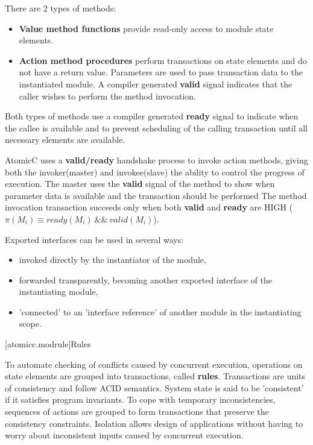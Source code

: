 There are 2 types of methods:
\begin{itemize}
\item \textbf{Value method functions} provide read-only access to module state elements.
\item \textbf{Action method procedures} perform transactions on state elements
and do not have a return value.
Parameters are used to pass transaction data to the instantiated module.
A compiler generated
\textbf{valid} signal indicates that the caller wishes to perform the method invocation.
\end{itemize}

Both types of methods use a compiler generated \textbf{ready} signal
to indicate when the callee is available and
to prevent scheduling of the calling transaction until all necessary elements are
available.

AtomicC uses a \textbf{valid/ready} handshake process\cite{Fletcher2009, AXISpec} to invoke action methods,
giving both the invoker(master) and invokee(slave) the ability to control the progress of execution.
The master uses the \textbf{valid} signal
of the method to show when parameter data is available and the transaction should be performed
The method invocation transaction succeeds only when
both \textbf{valid} and \textbf{ready} are HIGH ($\pi(M_{i}) \equiv ready(M_{i})\ \&\&\ valid(M_{i})$).

Exported interfaces can be used in several ways:
\begin{itemize}
\item invoked directly by the instantiator of the module,
\item forwarded transparently, becoming another exported interface of the instantiating module,
\item 'connected' to an 'interface reference' of another module in the instantiating scope.
\end{itemize}

[atomicc.modrule]{Rules}

To automate checking of conflicts caused by concurrent execution,
operations on state elements are grouped into transactions, called \textbf{rules}.
Transactions are units of consistency and follow ACID semantics.
System state is said to be 'consistent' if it satisfies program invariants.
To cope with temporary inconsistencies, sequences of actions are grouped to form
transactions that preserve the consistency constraints.
Isolation allows design of applications without having to worry about inconsistent inputs
caused by concurrent execution.

